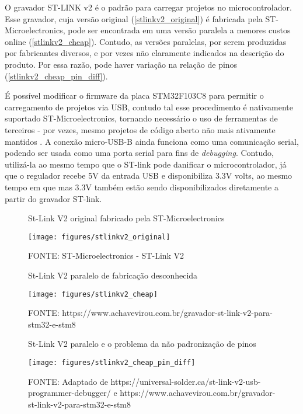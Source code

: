 O gravador ST-LINK v2 é o padrão para carregar projetos no microcontrolador.
Esse gravador, cuja versão original (\autoref{stlinkv2_original}) é fabricada
pela ST-Microelectronics, pode ser encontrada em uma versão paralela a menores
custos online (\autoref{stlinkv2_cheap}). Contudo, as versões paralelas, por
serem produzidas por fabricantes diversos, e por vezes não claramente indicados 
na descrição do produto. Por essa razão, pode haver variação na relação de
pinos (\autoref{stlinkv2_cheap_pin_diff}).

É possível modificar o firmware da placa STM32F103C8 para permitir o
carregamento de projetos via USB, contudo tal esse procedimento
é nativamente suportado ST-Microelectronics, tornando necessário o uso de
ferramentas de terceiros - por vezes, mesmo projetos de código aberto não mais
ativamente mantidos \cite{stm32duino_bootloader}.
A conexão micro-USB-B ainda funciona como uma comunicação serial, podendo ser
usada como uma porta serial para fins de \textit{debugging}. Contudo, utilizá-la
ao mesmo tempo que o ST-link pode danificar o microcontrolador, já que o
regulador recebe 5V da entrada USB e disponibiliza 3.3V volts, ao mesmo tempo
em que mas 3.3V também estão sendo disponibilizados diretamente a partir do
gravador ST-link.

\begin{figure}[ht]
	\centering
	\caption{St-Link V2 original fabricado pela ST-Microelectronics \cite{st_link_v2}}
	\texttt{[image: figures/stlinkv2\_original]}
	\caption*{FONTE: ST-Microelectronics - ST-Link V2}
    \label{stlinkv2_original}
\end{figure}


\begin{figure}[ht]
	\centering
	\caption{St-Link V2 paralelo de fabricação desconhecida \cite{stlinkv2_cheap_ref}}
	\texttt{[image: figures/stlinkv2\_cheap]}
	\caption*{FONTE: https://www.achavevirou.com.br/gravador-st-link-v2-para-stm32-e-stm8}
    \label{stlinkv2_cheap}
\end{figure}


\begin{figure}[htb]
	\centering
	\caption{St-Link V2 paralelo e o problema da não padronização de pinos}
	\texttt{[image: figures/stlinkv2\_cheap\_pin\_diff]}
	\caption*{
		FONTE: Adaptado de https://universal-solder.ca/st-link-v2-usb-programmer-debugger/
		e https://www.achavevirou.com.br/gravador-st-link-v2-para-stm32-e-stm8
	}
    \label{stlinkv2_cheap_pin_diff}
\end{figure}

